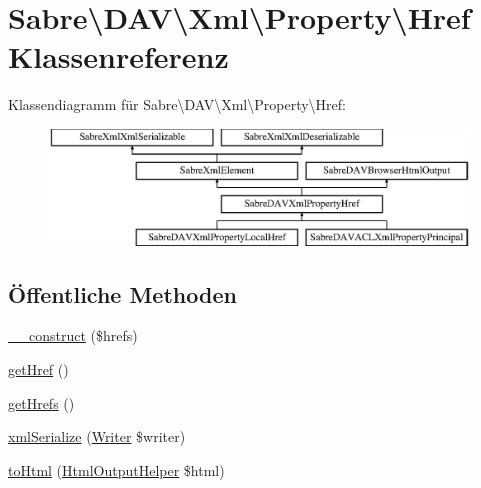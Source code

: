 \hypertarget{class_sabre_1_1_d_a_v_1_1_xml_1_1_property_1_1_href}{}\section{Sabre\textbackslash{}D\+AV\textbackslash{}Xml\textbackslash{}Property\textbackslash{}Href Klassenreferenz}
\label{class_sabre_1_1_d_a_v_1_1_xml_1_1_property_1_1_href}
Klassendiagramm für Sabre\textbackslash{}D\+AV\textbackslash{}Xml\textbackslash{}Property\textbackslash{}Href\+:\begin{figure}[H]
\begin{center}
\leavevmode
\includegraphics[height=3.085400cm]{class_sabre_1_1_d_a_v_1_1_xml_1_1_property_1_1_href}
\end{center}
\end{figure}
\subsection*{Öffentliche Methoden}
\begin{DoxyCompactItemize}
\item 
\mbox{\hyperlink{class_sabre_1_1_d_a_v_1_1_xml_1_1_property_1_1_href_a4bbe64d77061335cca13427418d6ae91}{\+\_\+\+\_\+construct}} (\$hrefs)
\item 
\mbox{\hyperlink{class_sabre_1_1_d_a_v_1_1_xml_1_1_property_1_1_href_a62a6f5fdaafccc9247f8ca9618c6174f}{get\+Href}} ()
\item 
\mbox{\hyperlink{class_sabre_1_1_d_a_v_1_1_xml_1_1_property_1_1_href_ad31c468be31868cdb742aa4c30a9615c}{get\+Hrefs}} ()
\item 
\mbox{\hyperlink{class_sabre_1_1_d_a_v_1_1_xml_1_1_property_1_1_href_ad1a4047eb7d32ddbf52aba7f5125f9fa}{xml\+Serialize}} (\mbox{\hyperlink{class_sabre_1_1_xml_1_1_writer}{Writer}} \$writer)
\item 
\mbox{\hyperlink{class_sabre_1_1_d_a_v_1_1_xml_1_1_property_1_1_href_a893c9969f099f1b54c0f852b0684c28f}{to\+Html}} (\mbox{\hyperlink{class_sabre_1_1_d_a_v_1_1_browser_1_1_html_output_helper}{Html\+Output\+Helper}} \$html)
\end{DoxyCompactItemize}
